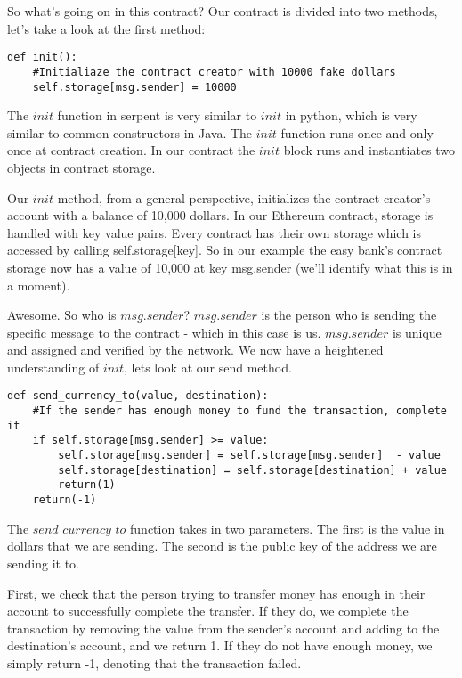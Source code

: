 \documentclass[12pt]{article}
\begin{document}
		
So what's going on in this contract?
Our contract is divided into two methods, let's take a look at the first method:

\begin{verbatim}
def init():
	#Initialiaze the contract creator with 10000 fake dollars
	self.storage[msg.sender] = 10000
\end{verbatim}
	
The $init$ function in serpent is very similar to $init$ in python, which is very similar to common constructors in Java. The $init$ function runs once and only once at contract creation. In our contract the $init$ block runs and instantiates two objects in contract storage.
 
Our $init$ method, from a general perspective, initializes the contract creator's account with a balance of 10,000 dollars. In our Ethereum contract, storage is handled with key value pairs. Every contract has their own storage which is accessed by calling self.storage[key]. So in our example the easy bank's contract storage now has a value of 10,000 at key msg.sender (we'll identify what this is in a moment).

 Awesome. So who is $msg.sender$? $msg.sender$ is the person who is sending the specific message to the contract - which in this case is us. $msg.sender$ is unique and assigned and verified by the network. We now have a heightened understanding of $init$, lets look at our send method.

\begin{verbatim}
def send_currency_to(value, destination):
	#If the sender has enough money to fund the transaction, complete it
	if self.storage[msg.sender] >= value:
		self.storage[msg.sender] = self.storage[msg.sender]  - value
		self.storage[destination] = self.storage[destination] + value
		return(1)
	return(-1)
\end{verbatim}

The $send\_currency\_to$ function takes in two parameters. The first is the value in dollars that we are sending. The second is the public key of the address we are sending it to. 

First, we check that the person trying to transfer money has enough in their account to successfully complete the transfer. If they do, we complete the transaction by removing the value from the sender's account and adding to the destination's account, and we return 1. If they do not have enough money, we simply return -1, denoting that the transaction failed. 
\end{document}
